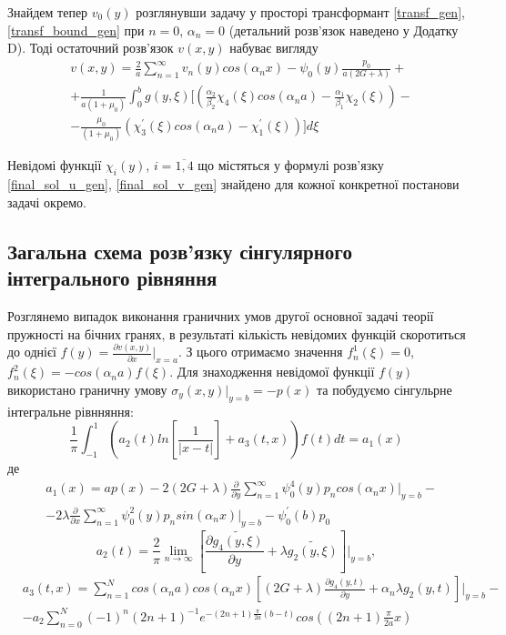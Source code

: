 Знайдем тепер $v_0(y)$ розглянувши задачу у просторі трансформант \eqref{transf_gen}, \eqref{transf_bound_gen} при $n=0$, $\alpha_n = 0$
(детальний розв'язок наведено у Додатку D). Тоді остаточний розв'язок $v(x,y)$ набуває вигляду
\begin{align}\label{final_sol_v_gen}
    &v(x,y) = \frac{2}{a} \sum_{n=1}^{\infty} v_n(y) cos(\alpha_n x) - \psi_0(y) \frac{p_0}{a(2G + \lambda)} + \nonumber \\
    &+ \frac{1}{a(1+\mu_0)} \int_{0}^{b}g(y,\xi) [ (\frac{\alpha_2}{\beta_2}\chi_4(\xi) cos(\alpha_n a) - \frac{\alpha_1}{\beta_1}\chi_2(\xi)) - \nonumber \\
    & - \frac{\mu_0}{(1+\mu_0)} (\chi_3^{'}(\xi) cos(\alpha_n a) -\chi_1^{'}(\xi)) ] d\xi
\end{align}

Невідомі функції $\chi_i(y)$, $i=\overline{1, 4}$ що містяться у формулі розв'язку \eqref{final_sol_u_gen}, \eqref{final_sol_v_gen} знайдено для кожної конкретної постанови задачі окремо.

\subsection{Загальна схема розв'язку сінгулярного інтегрального рівняння}
Розглянемо випадок виконання граничних умов другої основної задачі теорії пружності на бічних гранях, в результаті кількість невідомих функцій скоротиться до однієї $f(y) = \frac{\partial v(x,y)}{\partial x}|_{x=a}$.
З цього отримаємо значення $f_n^1(\xi) = 0$, $f_n^2(\xi)= -cos(\alpha_n a) f(\xi)$.
Для знаходження невідомої функції $f(y)$ використано граничну умову $\sigma_y(x, y) |_{y=b} = -p(x)$ та побудуємо сінгульрне інтегральне рівнняння:
\begin{equation}\label{int_eq_gen}
    \frac{1}{\pi} \int_{-1}^{1} \left( a_2(t) ln\left[ \frac{1}{\lvert x - t \rvert} \right] + a_3(t, x) \right) f(t) dt = a_1(x)
\end{equation}
де
\begin{align*}
    &a_1(x) = a p(x) - 2(2G + \lambda) \frac{\partial}{\partial y} \sum_{n=1}^{\infty} \psi_0^{4}(y) p_n cos(\alpha_n x)|_{y=b} - \nonumber \\
    &- 2\lambda \frac{\partial}{\partial x} \sum_{n=1}^{\infty}\psi_0^2(y) p_n sin(\alpha_n x)|_{y=b} - \psi_0^{'}(b) p_0
\end{align*}
\begin{equation*}
    a_2(t) = \frac{2}{\pi} \lim_{n \rightarrow \infty}\left[ \frac{\partial \widetilde{g_4(y, \xi)}}{\partial y} + \lambda \widetilde{g_2(y, \xi)} \right]|_{y=b}, 
\end{equation*}
\begin{align*}
    &a_3(t, x) = \sum_{n=1}^{N} cos(\alpha_n a) cos(\alpha_n x) \left[(2G + \lambda) \frac{\partial g_4(y, t)}{\partial y} + \alpha_n \lambda g_2(y, t) \right]|_{y=b} - \\
    & - a_2 \sum_{n=0}^{N} (-1)^n (2n + 1)^{-1} e^{-(2n + 1) \frac{\pi}{2a} (b - t)} cos((2n + 1) \frac{\pi}{2a} x)
\end{align*}

